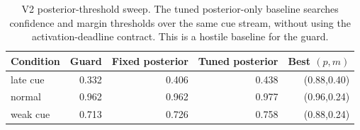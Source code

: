 \begin{table}[t]
\centering
\caption{V2 posterior-threshold sweep. The tuned posterior-only baseline searches confidence and margin thresholds over the same cue stream, without using the activation-deadline contract. This is a hostile baseline for the guard.}
\label{tab:posterior-sweep}
\begin{tabular}{lrrrr}
\toprule
Condition & Guard & Fixed posterior & Tuned posterior & Best $(p,m)$ \\
\midrule
late cue & 0.332 & 0.406 & 0.438 & (0.88,0.40) \\
normal & 0.962 & 0.962 & 0.977 & (0.96,0.24) \\
weak cue & 0.713 & 0.726 & 0.758 & (0.88,0.24) \\
\bottomrule
\end{tabular}
\end{table}
